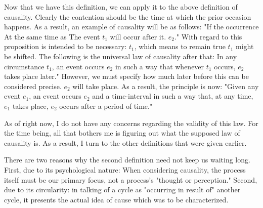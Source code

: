 \documentclass[a4paper,12pt]{book}[2004/02/16]
\theoremstyle{ilemma}
\theoremstyle{itheorem}
\theoremstyle{iother}
\theoremstyle{icorollary}
\theoremstyle{numcorollary}
\theoremstyle{idefinition}
\begin{document}
Now that we have this definition, we can apply it to the above definition of causality. Clearly the contention should be the time at which the
prior occasion happens. As a result, an example of causality will be as follows:
"If the occurrence At the same time as  The event $t_1$ will occur after it. $e_{2}$." With regard to this proposition is intended to be necessary: $t_1$, which means to remain true $t_{1}$ might be shifted. The following is the universal law of causality after that: In any circumstance $t_1$, an event occurs $e_2$ in such a way that whenever $t_1$ occurs, $e_2$ takes place later." However, we must specify how much later before this can be considered precise. $e_2$ will take place.
As a result, the principle is now: "Given any event $e_1$, an event occurs $e_2$ and a time-interval in such a way that, at any time, $e_1$ takes place,
$e_2$ occurs after a period of time."

As of right now, I do not have any concerns regarding the validity of this law. For the time being, all that bothers me is figuring out what the supposed law of causality is. As a result, I turn to the other definitions that were given earlier.

There are two reasons why the second definition need not keep us waiting long. First, due to its psychological nature: When considering causality, the process itself must be our primary focus, not a process's "thought or perception." Second, due to its circularity: in talking
of a cycle as "occurring in result of" another cycle, it
presents the actual idea of cause which was to be characterized.
\end{document}
